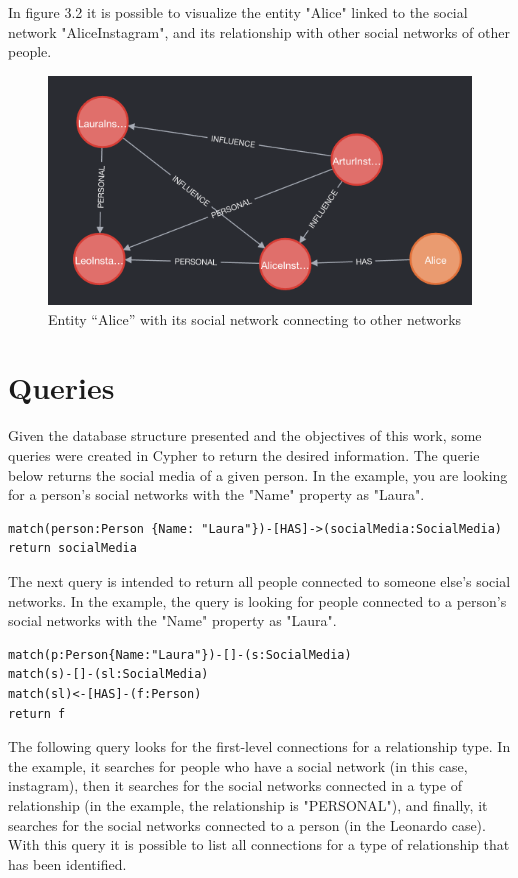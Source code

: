 In figure 3.2 it is possible to visualize the entity "Alice" linked to the social network "AliceInstagram", and its relationship with other social networks of other people.

\begin{figure}
    \centering
    \includegraphics[scale=0.5]{imagens/alice_others.png}
    \caption{
Entity “Alice” with its social network connecting to other networks}
    \label{fig:my_label}
\end{figure}

\section{Queries}

Given the database structure presented and the objectives of this work, some queries were created in Cypher to return the desired information. The querie below returns the social media of a given person. In the example, you are looking for a person's social networks with the "Name" property as "Laura".
\begin{verbatim}
match(person:Person {Name: "Laura"})-[HAS]->(socialMedia:SocialMedia) 
return socialMedia
\end{verbatim}


The next query is intended to return all people connected to someone else's social networks. In the example, the query is looking for people connected to a person's social networks with the "Name" property as "Laura".

\begin{verbatim}
match(p:Person{Name:"Laura"})-[]-(s:SocialMedia)
match(s)-[]-(sl:SocialMedia)
match(sl)<-[HAS]-(f:Person)
return f
\end{verbatim}

The following query looks for the first-level connections for a relationship type. In the example, it searches for people who have a social network (in this case, instagram), then it searches for the social networks connected in a type of relationship (in the example, the relationship is "PERSONAL"), and finally, it searches for the social networks connected to a person (in the Leonardo case). With this query it is possible to list all connections for a type of relationship that has been identified.


